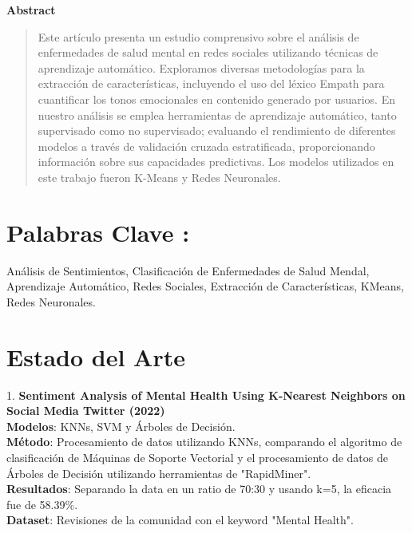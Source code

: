 \documentclass[
10pt, %
a4paper, %
oneside, %
headinclude,footinclude, %
BCOR5mm, %
]{scrartcl}
\begin{document}



\newpage %

\begin{center}
\textbf{Abstract}
\end{center}    
\begin{abstract}
Este artículo presenta un estudio comprensivo sobre el análisis de enfermedades de salud mental en redes sociales utilizando técnicas de aprendizaje automático.
Exploramos diversas metodologías para la extracción de características, incluyendo el uso del léxico Empath para cuantificar los tonos emocionales
en contenido generado por usuarios. En nuestro análisis se emplea herramientas de aprendizaje automático, tanto supervisado como no supervisado; 
evaluando el rendimiento de diferentes modelos a través de validación cruzada estratificada, proporcionando información sobre sus capacidades predictivas. Los modelos utilizados en 
este trabajo fueron K-Means y Redes Neuronales. 
\end{abstract}


\section*{Palabras Clave :} Análisis de Sentimientos, Clasificación de Enfermedades de Salud Mendal, Aprendizaje Automático, Redes
Sociales, Extracción de Características, KMeans, Redes Neuronales.

\tableofcontents

\section{Estado del Arte}

1. \textbf{Sentiment Analysis of Mental Health Using K-Nearest Neighbors on Social Media Twitter (2022)} \\
   \textbf{Modelos}: KNNs, SVM y Árboles de Decisión. \\
   \textbf{Método}: Procesamiento de datos utilizando KNNs, comparando el algoritmo de clasificación de Máquinas de Soporte Vectorial y el procesamiento de datos de Árboles de Decisión utilizando herramientas de "RapidMiner". \\
   \textbf{Resultados}: Separando la data en un ratio de 70:30 y usando k=5, la eficacia fue de 58.39\%. \\
   \textbf{Dataset}: Revisiones de la comunidad con el keyword "Mental Health".
\end{document}
